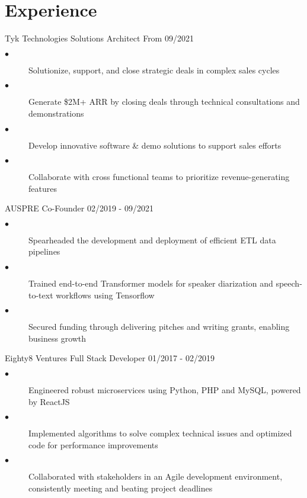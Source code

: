 \documentclass[]{twentysecondcv}
\begin{document}


\section{Experience}

\begin{twenty}
  \twentyitem
    {Tyk Technologies}
    {Solutions Architect}
    {From 09/2021}
    {
    \vspace{-15pt}
    \begin{description}
        \item[$\bullet$] Solutionize, support, and close strategic deals in complex sales cycles 
        \item[$\bullet$] Generate \$2M+ ARR by closing deals through technical consultations and demonstrations 
        \item[$\bullet$] Develop innovative software \& demo solutions to support sales efforts 
        \item[$\bullet$] Collaborate with cross functional teams to prioritize revenue-generating features
    \end{description}
    }
  \twentyitem
    {AUSPRE}
    {Co-Founder}
    {02/2019 - 09/2021}
    {
    \vspace{-15pt}
    \begin{description}
        \item[$\bullet$] Spearheaded the development and deployment of efficient ETL data pipelines
        \item[$\bullet$] Trained end-to-end Transformer models for speaker diarization and speech-to-text workflows using Tensorflow
        \item[$\bullet$] Secured funding through delivering pitches and writing grants, enabling business growth
    \end{description}
    }
\twentyitem
    {Eighty8 Ventures}
    {Full Stack Developer}
    {01/2017 - 02/2019}
    {
    \vspace{-15pt}
    \begin{description}
        \item[$\bullet$] Engineered robust microservices using Python, PHP and MySQL, powered by ReactJS
        \item[$\bullet$] Implemented algorithms to solve complex technical issues and optimized code for performance improvements
        \item[$\bullet$] Collaborated with stakeholders in an Agile development environment, consistently meeting and beating project deadlines
    \end{description}
    }


\end{twenty}
\end{document}
